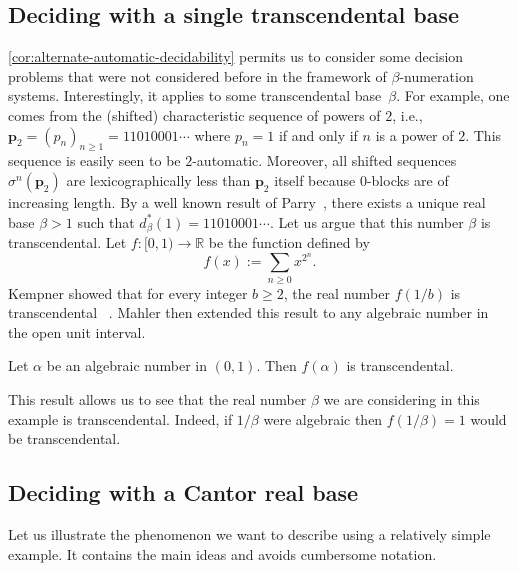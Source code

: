 \documentclass[12pt,reqno]{amsart}
\begin{document}
\subsection{Deciding with a single transcendental base}

\cref{cor:alternate-automatic-decidability} permits us to consider some decision problems that were not considered before in the framework of $\beta$-numeration systems. Interestingly, it applies to some transcendental base~$\beta$. For example, one comes from the (shifted) characteristic sequence of powers of $2$, i.e., $\mathbf{p}_2=(p_n)_{n\ge 1}=11010001\cdots$ where $p_n=1$ if and only if $n$ is a power of $2$. This sequence is easily seen to be $2$-automatic. Moreover, all shifted sequences $\sigma^n(\mathbf{p}_2)$ are lexicographically less than $\mathbf{p}_2$ itself because  $0$-blocks are of increasing length. By a well known result of Parry~\cite{Parry1960}, there exists a unique real base $\beta>1$ such that $d_\beta^*(1)=11010001\cdots$. Let us argue that this number $\beta$ is transcendental. Let $f\colon [0,1)\to\mathbb{R}$ be the function defined by 
\[
    f(x):=\sum_{n\ge 0}x^{2^n}.
\] 
Kempner showed that for every integer $b\ge 2$, the real number $f(1/b)$ is transcendental ~\cite{Kempner1916}. Mahler then extended this result to any algebraic number in the open unit interval. 
 
\begin{theorem}\cite{Mahler1929}
\label{thm:trans}
Let $\alpha$ be an algebraic number in $(0,1)$. Then $f(\alpha)$ is transcendental. 
\end{theorem}

This result allows us to see that the real number $\beta$ we are considering in this example is transcendental. Indeed, if $1/\beta$ were algebraic then $f(1/\beta)=1$ would be transcendental. 

\subsection{Deciding with a Cantor real base}\label{subsec:examplesmallpisot}

Let us illustrate the phenomenon we want to describe using a relatively simple example. It contains the main ideas and avoids cumbersome notation.
\end{document}
